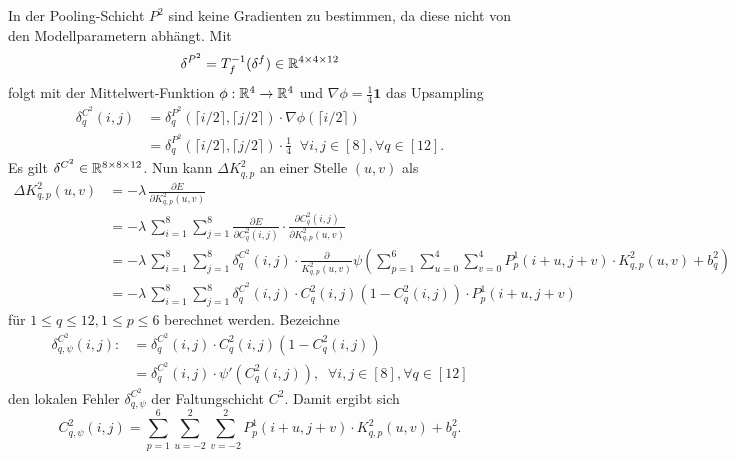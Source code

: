 In der Pooling-Schicht $P^2$ sind keine Gradienten zu bestimmen, da diese nicht von den Modellparametern abhängt. Mit
\begin{equation*}
    \delta^{P^2}=T_f^{-1}(\delta^f) \in \mathbb{R}^{4 \times 4 \times 12}
\end{equation*}
folgt mit der Mittelwert-Funktion $
\phi:\mathbb{R}^4 \rightarrow \mathbb{R}^4$ und $\nabla \phi=\frac{1}{4} \mathbf{1}$ das Upsampling
\begin{align*}
    \delta^{C^2}_q(i,j)&= \delta^{P^2}_q\left( \lceil i/2 \rceil, \lceil j/2 \rceil\right) \cdot \nabla \phi(\lceil i/2 \rceil)\\
    &=\delta^{P^2}_q\left( \lceil i/2 \rceil, \lceil j/2 \rceil\right) \cdot \frac{1}{4} \; \; \forall i,j \in [8], \forall q \in [12].
\end{align*}
Es gilt $\delta^{C^2} \in \mathbb{R}^{8 \times 8 \times 12}$. Nun kann $\Delta K^2_{q,p}$ an einer Stelle $(u,v)$ als
\begin{align*}
    \Delta K^2_{q,p}(u,v) &= -\lambda \, \frac{\partial E}{\partial K^2_{q,p}(u,v)} \\
                          &= -\lambda \, \sum_{i=1}^8 \sum_{j=1}^8 \frac{\partial E}{\partial C^2_q(i,j)} \cdot \frac{\partial C^2_q(i,j)}{\partial K_{q,p}^2(u,v)} \\
                          &= -\lambda \, \sum_{i=1}^8 \sum_{j=1}^8 \delta_q^{C^2}(i,j) \cdot \frac{\partial}{ K^2_{q,p}(u,v)} \psi \left( \sum_{p=1}^6 \sum_{u=0}^4 \sum_{v=0}^4 P^1_p(i+u,j+v) \cdot K_{q,p}^2(u,v) +b_q^2\right) \\
                          &= -\lambda \, \sum_{i=1}^8 \sum_{j=1}^8 \delta_q^{C^2}(i,j) \cdot C_q^2(i,j)\left(1-C_q^2(i,j)\right) \cdot P^1_p(i+u,j+v)
\end{align*}
für $1 \leq q \leq 12, 1 \leq p \leq 6$ berechnet werden.
Bezeichne
\begin{align*}
    \delta^{C^2}_{q,\psi}(i,j):&= \delta^{C^2}_q(i,j) \cdot C_q^2(i,j)\left(1- C_q^2(i,j)\right)\\
    &= \delta^{C^2}_q(i,j) \cdot \psi'(C^2_q(i,j)), \; \; \forall i,j \in [8], \forall q \in [12]
\end{align*} den lokalen Fehler $\delta^{C^2}_{q,\psi}$ der Faltungschicht $C^2$. Damit ergibt sich
\begin{equation*}
    C_{q,\psi}^2(i,j)=\sum_{p=1}^6 \sum_{u=-2}^2 \sum_{v=-2}^2 P^1_p(i+u,j+v) \cdot K^2_{q,p}(u,v) +b_q^2.
\end{equation*}
